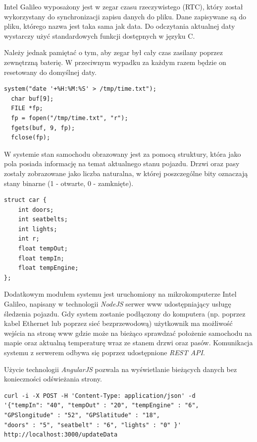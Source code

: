 \documentclass{xmgr}
\begin{document}
Intel Galileo wyposażony jest w zegar czasu rzeczywistego (RTC), który został wykorzystany do synchronizacji zapisu danych do pliku. Dane zapisywane są do pliku, którego nazwa jest taka sama jak data. Do odczytania aktualnej daty wystarczy użyć standardowych funkcji dostępnych w języku C. 

Należy jednak pamiętać o tym, aby zegar był cały czas zasilany poprzez zewnętrzną baterię. W przeciwnym wypadku za każdym razem będzie on resetowany do domyślnej daty.

\begin{lstlisting}[label=bot-dirs-alg,caption=Odczyt aktualnej daty]
  system("date '+%H:%M:%S' > /tmp/time.txt");
  char buf[9];
  FILE *fp;
  fp = fopen("/tmp/time.txt", "r");
  fgets(buf, 9, fp);
  fclose(fp);
\end{lstlisting}

W systemie stan samochodu obrazowany jest za pomocą struktury, która jako pola posiada informację na temat aktualnego stanu pojazdu. Drzwi oraz pasy zostały zobrazowane jako liczba naturalna, w której poszczególne bity oznaczają stany binarne (1 - otwarte, 0 - zamknięte).

\begin{lstlisting}[label=bot-dirs-alg,caption=Struktura samochodu w programie]
struct car {
	int doors;
 	int seatbelts;
 	int lights;         
 	int r;
 	float tempOut;
 	float tempIn;
 	float tempEngine;
};
\end{lstlisting}

Dodatkowym modułem systemu jest uruchomiony na mikrokomputerze Intel Galileo, napisany w technologii \emph{NodeJS} serwer www udostępniający usługę śledzenia pojazdu. Gdy system zostanie podłączony do komputera (np. poprzez kabel Ethernet lub poprzez sieć bezprzewodową) użytkownik ma możliwość wejścia na stronę www gdzie może na bieżąco sprawdzać położenie samochodu na mapie oraz aktualną temperaturę wraz ze stanem drzwi oraz pasów. Komunikacja systemu z serwerem odbywa się poprzez udostępnione \emph{REST API}. 

Użycie technologii \emph{AngularJS} pozwala na wyświetlanie bieżących danych bez konieczności odświeżania strony.

\begin{lstlisting}[label=bot-dirs-alg,caption=Request wysyłany do serwera www]
curl -i -X POST -H 'Content-Type: application/json' -d 
'{"tempIn": "40", "tempOut" : "20", "tempEngine" : "6", 
"GPSlongitude" : "52", "GPSlatitude" : "18", 
"doors" : "5", "seatbelt" : "6", "lights" : "0" }' 
http://localhost:3000/updateData
\end{lstlisting}
\end{document}
